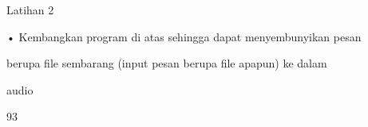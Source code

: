 \documentclass{article}
\begin{document}

Latihan 2 

• Kembangkan program di atas sehingga dapat menyembunyikan pesan 

berupa file sembarang (input pesan berupa file apapun) ke dalam  

audio

93
\end{document}
